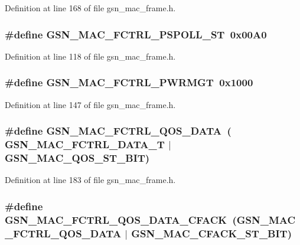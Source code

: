 Definition at line 168 of file gsn\_\-mac\_\-frame.h.

\hypertarget{a00523_ae1552ca3079dcc2ff62551f8fd83b6c7}{
\subsubsection[{GSN\_\-MAC\_\-FCTRL\_\-PSPOLL\_\-ST}]{\setlength{\rightskip}{0pt plus 5cm}\#define GSN\_\-MAC\_\-FCTRL\_\-PSPOLL\_\-ST~0x00A0}}
\label{a00523_ae1552ca3079dcc2ff62551f8fd83b6c7}


Definition at line 118 of file gsn\_\-mac\_\-frame.h.

\hypertarget{a00523_ac403e480a0762d46d7dcafc79fdc497a}{
\subsubsection[{GSN\_\-MAC\_\-FCTRL\_\-PWRMGT}]{\setlength{\rightskip}{0pt plus 5cm}\#define GSN\_\-MAC\_\-FCTRL\_\-PWRMGT~0x1000}}
\label{a00523_ac403e480a0762d46d7dcafc79fdc497a}


Definition at line 147 of file gsn\_\-mac\_\-frame.h.

\hypertarget{a00523_a93184f232fda6abb7e3662b769f26972}{
\subsubsection[{GSN\_\-MAC\_\-FCTRL\_\-QOS\_\-DATA}]{\setlength{\rightskip}{0pt plus 5cm}\#define GSN\_\-MAC\_\-FCTRL\_\-QOS\_\-DATA~( GSN\_\-MAC\_\-FCTRL\_\-DATA\_\-T   $|$ GSN\_\-MAC\_\-QOS\_\-ST\_\-BIT)}}
\label{a00523_a93184f232fda6abb7e3662b769f26972}


Definition at line 183 of file gsn\_\-mac\_\-frame.h.

\hypertarget{a00523_acc5ff76613fecc27b9043c6b11e5becd}{
\subsubsection[{GSN\_\-MAC\_\-FCTRL\_\-QOS\_\-DATA\_\-CFACK}]{\setlength{\rightskip}{0pt plus 5cm}\#define GSN\_\-MAC\_\-FCTRL\_\-QOS\_\-DATA\_\-CFACK~(GSN\_\-MAC\_\-FCTRL\_\-QOS\_\-DATA  $|$ GSN\_\-MAC\_\-CFACK\_\-ST\_\-BIT)}}
\label{a00523_acc5ff76613fecc27b9043c6b11e5becd}


